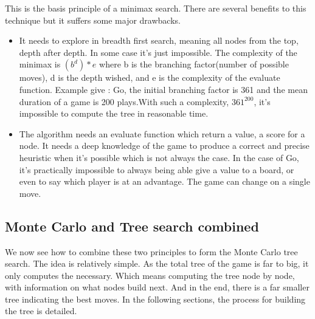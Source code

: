 	
 This is the basis principle of a minimax search. There are several benefits to this technique but it suffers some major drawbacks. 
 
 \begin{itemize}
 \item It needs to explore in breadth first search, meaning all nodes from the top, depth after depth. In some case it's just impossible. The complexity of the minimax is $(b^d)*e$ where b is the branching factor(number of possible moves), d is the depth wished, and e is the complexity of the evaluate function. Example give : Go, the initial branching factor is 361 and the mean duration of a game is 200 plays.With such a complexity, $361^200$, it's impossible to compute the tree in reasonable time.
 \item The algorithm needs an evaluate function which return a value, a score for a node. It needs a deep knowledge of the game to produce a correct and precise heuristic when it's possible which is not always the case. In the case of Go, it's practically impossible to always being able give a value to a board, or even to say which player is at an advantage. The game can change on a single move. 
 \end{itemize}

\subsection{Monte Carlo and Tree search combined}

We now see how to combine these two principles to form the Monte Carlo tree search. The idea is relatively simple. As the total tree of the game is far to big, it only computes the necessary. Which means computing the tree node by node, with information on what nodes build next. And in the end, there is a far smaller tree indicating the best moves. In the following sections, the process for building the tree is detailed. 

